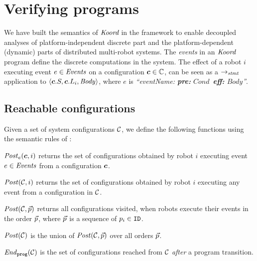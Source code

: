 
\section{Verifying  \lgname programs}
\label{sec:verification}

\newcommand{\Ev}{\ensuremath{e}\xspace}
\newcommand{\EvCond}{\ensuremath{\mathit{Cond}}\xspace}
\newcommand{\EvBody}{\ensuremath{\mathit{Body}}\xspace}


We have built the semantics of $\emph{Koord}$ in the \K framework to enable decoupled analyses of platform-independent discrete part and the platform-dependent (dynamic) parts of distributed multi-robot systems. The \emph{events} in an $\emph{Koord}$ program define the discrete computations in the system.
The effect of a robot $i$ executing event $\Ev \in \Event$ on a configuration $\mathit{\boldsymbol{c}} \in \mathbb{C}$,
can be seen as a $\rightarrow_\mathit{stmt}$ application to  $\left\langle \gconfig.S, \gconfig.\lconfig{i}, \EvBody \right\rangle $,
where $\Ev$ is \emph{``eventName: {\normalfont\bf pre:} \EvCond\ {\normalfont\bf eff:} \EvBody''}.


\subsection{Reachable configurations}

Given a set of system configurations $\mathcal{C}$,
we define the following functions using the semantic rules of :
\begin{inparaenum}[(i)]
    \item $\Post_\Ev(\gconfig,i)$ returns the set of configurations obtained by robot $i$ executing event $\Ev \in \Event$ from a configuration $\mathit{\boldsymbol{c}}$.
    \item $\mathit{Post}(\mathcal{C},i)$ returns the set of configurations obtained by robot $i$ executing any event from a configuration in $\mathcal{C}$.
    \item $\mathit{Post}(\mathcal{C},\vec{p})$ returns all configurations visited, when robots execute their events in the order $\vec{p}$,
          where $\vec{p}$ is a sequence of $p_i \in \texttt{ID}$.
    \item $\mathit{Post}(\mathcal{C})$ is the union of $\mathit{Post}(\mathcal{C},\vec{p})$ over all orders $\vec{p}$.
    \item $\mathit{End}_{\mathtt{prog}}(\mathcal{C})$ is the set of configurations reached from $\mathcal{C}$ \emph{after} a program transition.
\end{inparaenum}

